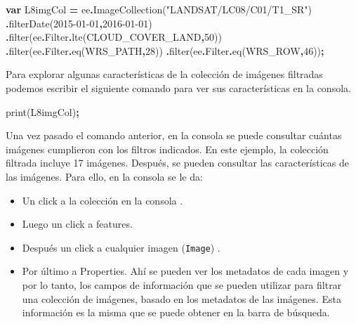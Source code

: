 \documentclass[
  12pt,
  letterpaper,
  twoside]{book}
\newenvironment{Shaded}{\begin{snugshade}}{\end{snugshade}}
\newcommand{\AttributeTok}[1]{\textcolor[rgb]{0.77,0.63,0.00}{#1}}
\newcommand{\DecValTok}[1]{\textcolor[rgb]{0.00,0.00,0.81}{#1}}
\newcommand{\FunctionTok}[1]{\textcolor[rgb]{0.00,0.00,0.00}{#1}}
\newcommand{\KeywordTok}[1]{\textcolor[rgb]{0.13,0.29,0.53}{\textbf{#1}}}
\newcommand{\NormalTok}[1]{#1}
\newcommand{\OperatorTok}[1]{\textcolor[rgb]{0.81,0.36,0.00}{\textbf{#1}}}
\newcommand{\StringTok}[1]{\textcolor[rgb]{0.31,0.60,0.02}{#1}}
\providecommand{\tightlist}{%
  \setlength{\itemsep}{0pt}\setlength{\parskip}{0pt}}
\begin{document}
\begin{Shaded}
\begin{Highlighting}[]
\KeywordTok{var}\NormalTok{ L8imgCol }\OperatorTok{=}\NormalTok{ ee}\OperatorTok{.}\FunctionTok{ImageCollection}\NormalTok{(}\StringTok{"LANDSAT/LC08/C01/T1\_SR"}\NormalTok{)}
  \OperatorTok{.}\FunctionTok{filterDate}\NormalTok{(}\StringTok{\textquotesingle{}2015{-}01{-}01\textquotesingle{}}\OperatorTok{,}\StringTok{\textquotesingle{}2016{-}01{-}01\textquotesingle{}}\NormalTok{)}
  \OperatorTok{.}\FunctionTok{filter}\NormalTok{(ee}\OperatorTok{.}\AttributeTok{Filter}\OperatorTok{.}\FunctionTok{lte}\NormalTok{(}\StringTok{\textquotesingle{}CLOUD\_COVER\_LAND\textquotesingle{}}\OperatorTok{,}\DecValTok{50}\NormalTok{))}
  \OperatorTok{.}\FunctionTok{filter}\NormalTok{(ee}\OperatorTok{.}\AttributeTok{Filter}\OperatorTok{.}\FunctionTok{eq}\NormalTok{(}\StringTok{\textquotesingle{}WRS\_PATH\textquotesingle{}}\OperatorTok{,}\DecValTok{28}\NormalTok{))}
  \OperatorTok{.}\FunctionTok{filter}\NormalTok{(ee}\OperatorTok{.}\AttributeTok{Filter}\OperatorTok{.}\FunctionTok{eq}\NormalTok{(}\StringTok{\textquotesingle{}WRS\_ROW\textquotesingle{}}\OperatorTok{,}\DecValTok{46}\NormalTok{))}\OperatorTok{;}
\end{Highlighting}
\end{Shaded}

Para explorar algunas características de la colección de imágenes filtradas podemos escribir el siguiente comando para ver sus características en la consola.

\begin{Shaded}
\begin{Highlighting}[]
\FunctionTok{print}\NormalTok{(L8imgCol)}\OperatorTok{;}
\end{Highlighting}
\end{Shaded}

Una vez pasado el comando anterior, en la consola se puede consultar cuántas imágenes cumplieron con los filtros indicados. En este ejemplo, la colección filtrada incluye 17 imágenes. Después, se pueden consultar las características de las imágenes. Para ello, en la consola se le da:

\begin{itemize}
\tightlist
\item
  Un click a la colección en la consola .
\item
  Luego un click a features.
\item
  Después un click a cualquier imagen (\texttt{Image}) .
\item
  Por último a Properties. Ahí se pueden ver los metadatos de cada imagen y por lo tanto, los campos de información que se pueden utilizar para filtrar una colección de imágenes, basado en los metadatos de las imágenes. Esta información es la misma que se puede obtener en la barra de búsqueda.
\end{itemize}
\end{document}
